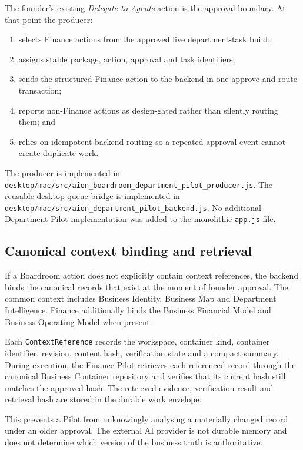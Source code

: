 The founder's existing \emph{Delegate to Agents} action is the approval boundary.  At that point the producer:
\begin{enumerate}
  \item selects Finance actions from the approved live department-task build;
  \item assigns stable package, action, approval and task identifiers;
  \item sends the structured Finance action to the backend in one approve-and-route transaction;
  \item reports non-Finance actions as design-gated rather than silently routing them; and
  \item relies on idempotent backend routing so a repeated approval event cannot create duplicate work.
\end{enumerate}

The producer is implemented in \texttt{desktop/mac/src/aion\_boardroom\_department\_pilot\_producer.js}.  The reusable desktop queue bridge is implemented in \texttt{desktop/mac/src/aion\_department\_pilot\_backend.js}.  No additional Department Pilot implementation was added to the monolithic \texttt{app.js} file.

\subsection{Canonical context binding and retrieval}

If a Boardroom action does not explicitly contain context references, the backend binds the canonical records that exist at the moment of founder approval.  The common context includes Business Identity, Business Map and Department Intelligence.  Finance additionally binds the Business Financial Model and Business Operating Model when present.

Each \texttt{ContextReference} records the workspace, container kind, container identifier, revision, content hash, verification state and a compact summary.  During execution, the Finance Pilot retrieves each referenced record through the canonical Business Container repository and verifies that its current hash still matches the approved hash.  The retrieved evidence, verification result and retrieval hash are stored in the durable work envelope.

This prevents a Pilot from unknowingly analysing a materially changed record under an older approval.  The external AI provider is not durable memory and does not determine which version of the business truth is authoritative.

